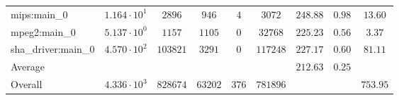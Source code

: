 \begin{tabular}{|l|c|c|c|c|c|c|c|c|}
mips:main\_0            & $ 1.164 \cdot 10^{1}  $ & $ 2896   $ & $ 946   $ & $ 4   $ & $ 3072   $ & $ 248.88      $ & $ 0.98    $ & $ 13.60   $ \\
mpeg2:main\_0           & $ 5.137 \cdot 10^{0}  $ & $ 1157   $ & $ 1105  $ & $ 0   $ & $ 32768  $ & $ 225.23      $ & $ 0.56    $ & $ 3.37    $ \\
sha\_driver:main\_0     & $ 4.570 \cdot 10^{2}  $ & $ 103821 $ & $ 3291  $ & $ 0   $ & $ 117248 $ & $ 227.17      $ & $ 0.60    $ & $ 81.11   $ \\
\hline
Average                 & $                     $ & $        $ & $       $ & $     $ & $        $ & $ 212.63      $ & $ 0.25    $ & $         $ \\
\hline
Overall                 & $ 4.336 \cdot 10^{3}  $ & $ 828674 $ & $ 63202 $ & $ 376 $ & $ 781896 $ & $             $ & $         $ & $ 753.95  $ \\
\hline
\end{tabular}
